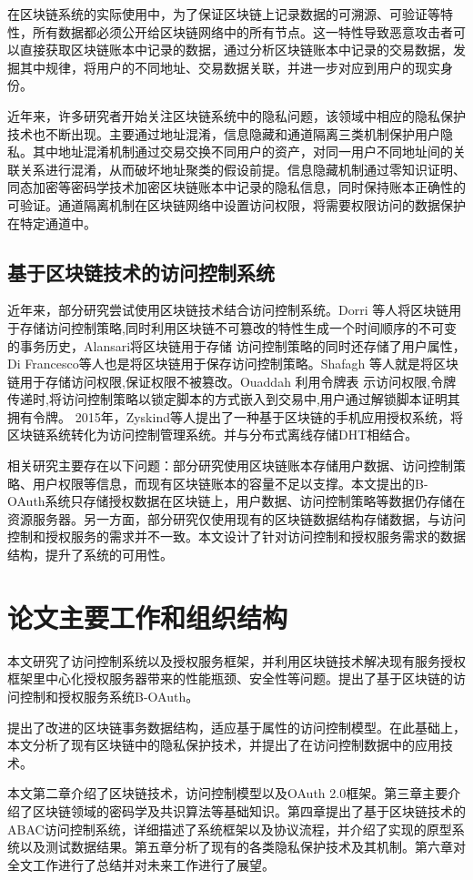 在区块链系统的实际使用中，为了保证区块链上记录数据的可溯源、可验证等特性，所有数据都必须公开给区块链网络中的所有节点。这一特性导致恶意攻击者可以直接获取区块链账本中记录的数据，通过分析区块链账本中记录的交易数据，发掘其中规律，将用户的不同地址、交易数据关联，并进一步对应到用户的现实身份。 

近年来，许多研究者开始关注区块链系统中的隐私问题，该领域中相应的隐私保护技术也不断出现。主要通过地址混淆，信息隐藏和通道隔离三类机制保护用户隐私。其中地址混淆机制通过交易交换不同用户的资产，对同一用户不同地址间的关联关系进行混淆，从而破坏地址聚类的假设前提。信息隐藏机制通过零知识证明、同态加密等密码学技术加密区块链账本中记录的隐私信息，同时保持账本正确性的可验证。通道隔离机制在区块链网络中设置访问权限，将需要权限访问的数据保护在特定通道中。

\subsection{基于区块链技术的访问控制系统}

近年来，部分研究尝试使用区块链技术结合访问控制系统。Dorri 等人将区块链用于存储访问控制策略,同时利用区块链不可篡改的特性生成一个时间顺序的不可变的事务历史，Alansari将区块链用于存储 访问控制策略的同时还存储了用户属性，Di Francesco等人也是将区块链用于保存访问控制策略。Shafagh 等人就是将区块链用于存储访问权限,保证权限不被篡改。Ouaddah 利用令牌表 示访问权限,令牌传递时,将访问控制策略以锁定脚本的方式嵌入到交易中,用户通过解锁脚本证明其拥有令牌。
2015年，Zyskind等人提出了一种基于区块链的手机应用授权系统，将区块链系统转化为访问控制管理系统。并与分布式离线存储DHT相结合。

相关研究主要存在以下问题：部分研究使用区块链账本存储用户数据、访问控制策略、用户权限等信息，而现有区块链账本的容量不足以支撑。本文提出的B-OAuth系统只存储授权数据在区块链上，用户数据、访问控制策略等数据仍存储在资源服务器。另一方面，部分研究仅使用现有的区块链数据结构存储数据，与访问控制和授权服务的需求并不一致。本文设计了针对访问控制和授权服务需求的数据结构，提升了系统的可用性。

\section{论文主要工作和组织结构}

本文研究了访问控制系统以及授权服务框架，并利用区块链技术解决现有服务授权框架里中心化授权服务器带来的性能瓶颈、安全性等问题。提出了基于区块链的访问控制和授权服务系统B-OAuth。

提出了改进的区块链事务数据结构，适应基于属性的访问控制模型。在此基础上，本文分析了现有区块链中的隐私保护技术，并提出了在访问控制数据中的应用技术。

本文第二章介绍了区块链技术，访问控制模型以及OAuth 2.0框架。第三章主要介绍了区块链领域的密码学及共识算法等基础知识。第四章提出了基于区块链技术的ABAC访问控制系统，详细描述了系统框架以及协议流程，并介绍了实现的原型系统以及测试数据结果。第五章分析了现有的各类隐私保护技术及其机制。第六章对全文工作进行了总结并对未来工作进行了展望。
